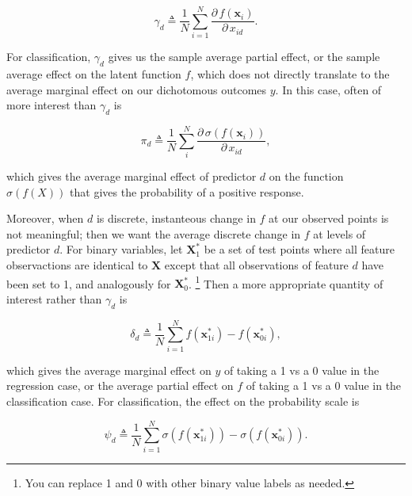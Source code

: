 \documentclass{draft}
\newcommand{\pd}{\ensuremath{\partial \,}}     %
\begin{document}
\begin{equation}
    \gamma_d \triangleq \dfrac{1}{N} \sum_{i = 1}^N \dfrac{\pd f \left( \mathbf{x}_i \right) }{\pd x_{id}}.
\end{equation}

\noindent
For classification, \( \gamma_d \) gives us the sample average partial effect,
or the sample average effect on the latent function \( f \),
which does not directly translate to the average marginal effect on our dichotomous outcomes \( y \).
In this case, often of more interest than \( \gamma_d \) is

\begin{equation}
    \pi_d \triangleq \dfrac{1}{N} \sum_i^N \dfrac{\pd \sigma \left( f \left( \mathbf{x}_i \right) \right)}{\pd x_{id}},
\end{equation}

\noindent
which gives the average marginal effect of predictor \( d \) on the function \( \sigma \left( f \left( X \right) \right) \)
that gives the probability of a positive response.

Moreover, when \( d \) is discrete, instanteous change in \( f \) at our observed points is not meaningful;
then we want the average discrete change in \( f \) at levels of predictor \( d \).
For binary variables, let \( \mathbf{X}_1^\ast \) be a set of test points where all feature observactions are identical to \( \mathbf{X} \)
except that all observations of feature \( d \) have been set to 1, and analogously for \( \mathbf{X}_0^\ast \).%
\footnote{
    You can replace 1 and 0 with other binary value labels as needed.
}
Then a more appropriate quantity of interest rather than \( \gamma_d \) is

\begin{equation}
    \delta_d \triangleq \dfrac{1}{N} \sum_{i=1}^N f \left( \mathbf{x}_{1i}^\ast \right) - f \left( \mathbf{x}_{0i}^\ast \right),
\end{equation}

\noindent
which gives the average marginal effect on \( y \) of taking a 1 vs a 0 value in the regression case,
or the average partial effect on \( f \) of taking a 1 vs a 0 value in the classification case.
For classification, the effect on the probability scale is

\begin{equation}
    \psi_d \triangleq \dfrac{1}{N} \sum_{i=1}^N \sigma \left( f \left( \mathbf{x}_{1i}^\ast \right) \right) - \sigma \left( f \left( \mathbf{x}_{0i}^\ast \right) \right).
\end{equation}
\end{document}
